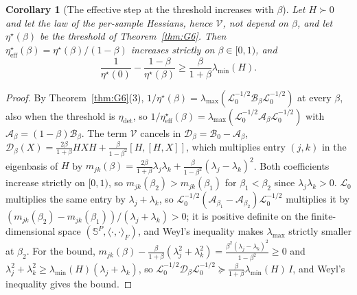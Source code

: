 \documentclass[11pt]{article}
\newtheorem{corollary}[theorem]{Corollary}
\theoremstyle{remark}
\begin{document}
\begin{corollary}[The effective step at the threshold increases with $\beta$]\label{cor:etaeff}
Let $H\succ0$ and let the law of the per-sample Hessians, hence $\mathcal V$, not depend on $\beta$, and let $\eta^\star(\beta)$ be the threshold of Theorem~\ref{thm:G6}. Then $\eta^\star_{\mathrm{eff}}(\beta)=\eta^\star(\beta)/(1-\beta)$ increases strictly on $\beta\in[0,1)$, and
\[
\frac1{\eta^\star(0)}-\frac{1-\beta}{\eta^\star(\beta)}\ge\frac{\beta}{1+\beta}\lambda_{\min}(H).
\]
\end{corollary}
\begin{proof}
By Theorem~\ref{thm:G6}(3), $1/\eta^\star(\beta)=\lambda_{\max}(\mathcal L_0^{-1/2}\mathcal B_\beta\mathcal L_0^{-1/2})$ at every $\beta$, also when the threshold is $\eta_{\mathrm{det}}$, so $1/\eta^\star_{\mathrm{eff}}(\beta)=\lambda_{\max}(\mathcal L_0^{-1/2}\mathcal A_\beta\mathcal L_0^{-1/2})$ with $\mathcal A_\beta=(1-\beta)\mathcal B_\beta$. The term $\mathcal V$ cancels in $\mathcal D_\beta=\mathcal B_0-\mathcal A_\beta$, $\mathcal D_\beta(X)=\frac{2\beta}{1+\beta}HXH+\frac{\beta}{1-\beta^2}[H,[H,X]]$, which multiplies entry $(j,k)$ in the eigenbasis of $H$ by $m_{jk}(\beta)=\frac{2\beta}{1+\beta}\lambda_j\lambda_k+\frac{\beta}{1-\beta^2}(\lambda_j-\lambda_k)^2$. Both coefficients increase strictly on $[0,1)$, so $m_{jk}(\beta_2)>m_{jk}(\beta_1)$ for $\beta_1<\beta_2$ since $\lambda_j\lambda_k>0$. $\mathcal L_0$ multiplies the same entry by $\lambda_j+\lambda_k$, so $\mathcal L_0^{-1/2}(\mathcal A_{\beta_1}-\mathcal A_{\beta_2})\mathcal L_0^{-1/2}$ multiplies it by $(m_{jk}(\beta_2)-m_{jk}(\beta_1))/(\lambda_j+\lambda_k)>0$; it is positive definite on the finite-dimensional space $(\mathbb S^P,\langle\cdot,\cdot\rangle_F)$, and Weyl's inequality makes $\lambda_{\max}$ strictly smaller at $\beta_2$. For the bound, $m_{jk}(\beta)-\frac{\beta}{1+\beta}(\lambda_j^2+\lambda_k^2)=\frac{\beta^2(\lambda_j-\lambda_k)^2}{1-\beta^2}\ge0$ and $\lambda_j^2+\lambda_k^2\ge\lambda_{\min}(H)(\lambda_j+\lambda_k)$, so $\mathcal L_0^{-1/2}\mathcal D_\beta\mathcal L_0^{-1/2}\succeq\frac{\beta}{1+\beta}\lambda_{\min}(H)\,I$, and Weyl's inequality gives the bound.
\end{proof}
\end{document}
